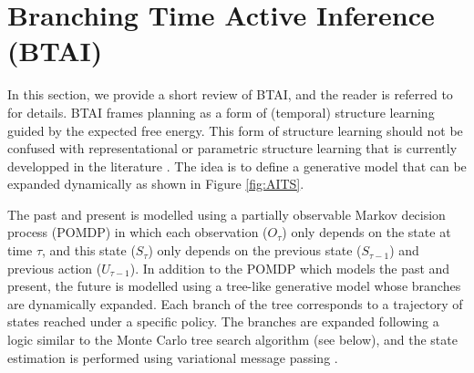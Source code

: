 \documentclass[twoside,11pt]{article}
\begin{document}
\section{Branching Time Active Inference (BTAI)} \label{sec:ai_ts}

In this section, we provide a short review of BTAI, and the reader is referred to \citep{AITS_THEORY} for details. BTAI frames planning as a form of (temporal) structure learning guided by the expected free energy. This form of structure learning should not be confused with representational or parametric structure learning that is currently developped in the literature \citep{structure_learning,FRISTON2016413,BMR}. The idea is to define a generative model that can be expanded dynamically as shown in Figure \ref{fig:AITS}.

The past and present is modelled using a partially observable Markov decision process (POMDP) in which each observation ($O_\tau$) only depends on the state at time $\tau$, and this state ($S_\tau$) only depends on the previous state ($S_{\tau - 1}$) and previous action ($U_{\tau - 1}$). In addition to the POMDP which models the past and present, the future is modelled using a tree-like generative model whose branches are dynamically expanded. Each branch of the tree corresponds to a trajectory of states reached under a specific policy. The branches are expanded following a logic similar to the Monte Carlo tree search algorithm (see below), and the state estimation is performed using variational message passing \citep{VMP_TUTO,AI_VMP,believe}.
\end{document}

